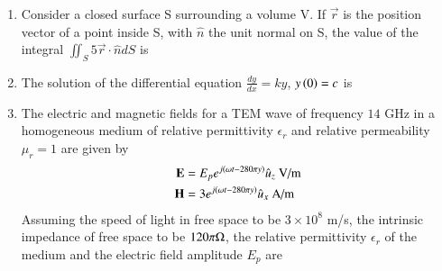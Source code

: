 \documentclass[a4paper, 11pt]{article}
\begin{document}
\begin{enumerate}
    \hfill{}

    \item Consider a closed surface S surrounding a volume V. If $\vec{r}$ is the position vector of a point inside S, with $\hat{n}$ the unit normal on S, the value of the integral $\iint_{S}5\vec{r}\cdot\hat{n}dS$ is
    
    \begin{enumerate}
    \end{enumerate}

    \hfill{}

    \item The solution of the differential equation $\frac{dy}{dx}=ky$, $y\left(0\right)=c$ is
    
    \begin{enumerate}
    \end{enumerate}

    \hfill{}
    
    \item The electric and magnetic fields for a TEM wave of frequency $14$ GHz in a homogeneous medium of relative permittivity $\epsilon_{r}$ and relative permeability $\mu_{r}=1$ are given by
    \begin{align*}
        \mathbf{E} &= E_{p}e^{j\left(\omega t-280\pi y\right)}\hat{u}_{z} \text{ V/m} \\
        \mathbf{H} &= 3e^{j\left(\omega t-280\pi y\right)}\hat{u}_{x} \text{ A/m}
    \end{align*}
    Assuming the speed of light in free space to be $3\times10^{8}$ m/s, the intrinsic impedance of free space to be $120\pi \ohm$, the relative permittivity $\epsilon_{r}$ of the medium and the electric field amplitude $E_{p}$ are
    

\end{enumerate}
\end{document}
